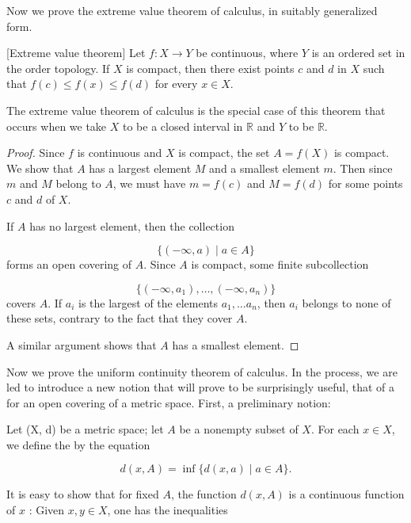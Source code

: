 Now we prove the extreme value theorem of calculus, in suitably generalized form.

\begin{theorem}
\label{thm:\thetheorem}[Extreme value theorem]
 Let \(f : X \rightarrow Y\) be continuous, where \(Y\) is an ordered set in the order topology. If \(X\) is compact, then there exist points \(c\) and \(d\) in \(X\) such that \(f( c) \leq f(x) \leq f( d)\) for every \(x \in X\).

The extreme value theorem of calculus is the special case of this theorem that occurs when we take \(X\) to be a closed interval in \(\mathbb{R}\) and \(Y\) to be \(\mathbb{R}\).

\end{theorem}
\begin{proof}
Since \(f\) is continuous and \(X\) is compact, the set \(A = f( X)\) is compact. We show that \(A\) has a largest element \(M\) and a smallest element \(m\). Then since \(m\) and \(M\) belong to \(A\), we must have \(m = f( c)\) and \(M = f( d)\) for some points \(c\) and \(d\) of \(X\).

If \(A\) has no largest element, then the collection

\[
\{ ( {-\infty, a}) \mid a \in A\}
\]
forms an open covering of \(A\). Since \(A\) is compact, some finite subcollection

\[
\{ {( {-\infty ,a_{1}}),\ldots ,( {-\infty ,a_{n}}) }\}
\]
covers \(A\). If \(a_{i}\) is the largest of the elements \(a_{1},\ldots {a}_{n}\), then \(a_{i}\) belongs to none of these sets, contrary to the fact that they cover \(A\).

A similar argument shows that \(A\) has a smallest element.
\end{proof}

Now we prove the uniform continuity theorem of calculus. In the process, we are led to introduce a new notion that will prove to be surprisingly useful, that of a  for an open covering of a metric space. First, a preliminary notion:

\begin{definition}
 Let (X, d) be a metric space; let \(A\) be a nonempty subset of \(X\). For each \(x \in X\), we define the  by the equation

\[
d( {x,A}) = \inf \{ d( {x,a}) \mid a \in A\}.
\]
\end{definition}

It is easy to show that for fixed \(A\), the function \(d( {x,A})\) is a continuous function of \(x\) : Given \(x,y \in X\), one has the inequalities

